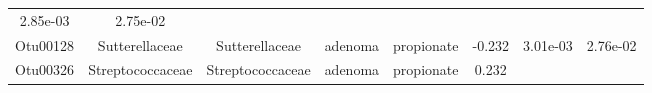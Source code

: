 \documentclass[11pt,]{article}
\begin{document}
\begin{longtable}[]{@{}cccccccc@{}}
\begin{minipage}[t]{0.08\columnwidth}
2.85e-03\strut
\end{minipage} & \begin{minipage}[t]{0.08\columnwidth}\centering\strut
2.75e-02\strut
\end{minipage}\tabularnewline
\begin{minipage}[t]{0.08\columnwidth}\centering\strut
Otu00128\strut
\end{minipage} & \begin{minipage}[t]{0.15\columnwidth}\centering\strut
Sutterellaceae\strut
\end{minipage} & \begin{minipage}[t]{0.15\columnwidth}\centering\strut
Sutterellaceae\strut
\end{minipage} & \begin{minipage}[t]{0.08\columnwidth}\centering\strut
adenoma\strut
\end{minipage} & \begin{minipage}[t]{0.09\columnwidth}\centering\strut
propionate\strut
\end{minipage} & \begin{minipage}[t]{0.07\columnwidth}\centering\strut
-0.232\strut
\end{minipage} & \begin{minipage}[t]{0.08\columnwidth}\centering\strut
3.01e-03\strut
\end{minipage} & \begin{minipage}[t]{0.08\columnwidth}\centering\strut
2.76e-02\strut
\end{minipage}\tabularnewline
\begin{minipage}[t]{0.08\columnwidth}\centering\strut
Otu00326\strut
\end{minipage} & \begin{minipage}[t]{0.15\columnwidth}\centering\strut
Streptococcaceae\strut
\end{minipage} & \begin{minipage}[t]{0.15\columnwidth}\centering\strut
Streptococcaceae\strut
\end{minipage} & \begin{minipage}[t]{0.08\columnwidth}\centering\strut
adenoma\strut
\end{minipage} & \begin{minipage}[t]{0.09\columnwidth}\centering\strut
propionate\strut
\end{minipage} & \begin{minipage}[t]{0.07\columnwidth}\centering\strut
0.232\strut
\end{minipage} & \begin{minipage}[t]{0.08\columnwidth}\centering\strut

\end{minipage}
\end{longtable}
\end{document}
